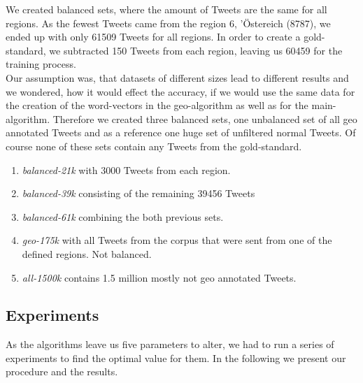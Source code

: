 \documentclass[../Main.tex]{subfiles}
\begin{document}
We created balanced sets, where the amount of  Tweets are the same for all regions. As the fewest Tweets came from the region 6, 'Östereich (8787),  we ended up with only 61509 Tweets for all regions.  
In order to create a gold-standard, we subtracted 150 Tweets from each region, leaving us 60459 for the training process. \\
Our assumption was, that datasets of different sizes lead to different results and we wondered, how it would effect the accuracy, if we would use the same data for the creation of the word-vectors in the geo-algorithm as well as for the main-algorithm. Therefore we created three balanced sets, one unbalanced set of all geo annotated Tweets and as a reference one huge set of unfiltered normal Tweets. Of course none of these sets contain any Tweets from the gold-standard.
 \begin{enumerate}
\item \emph{balanced-21k} with 3000 Tweets from each region.
\item \emph{balanced-39k} consisting of the remaining 39456 Tweets
\item \emph{balanced-61k} combining the both previous sets. 
\item \emph{geo-175k} with all Tweets from the corpus that were sent from one of the defined regions. Not balanced.
\item \emph{all-1500k} contains 1.5 million mostly not geo annotated Tweets.
\end{enumerate}
\subsection{Experiments}
As the algorithms leave us five parameters to alter, we had to run a series of experiments to find the optimal value for them. In the following we present our procedure and the results.
\end{document}
